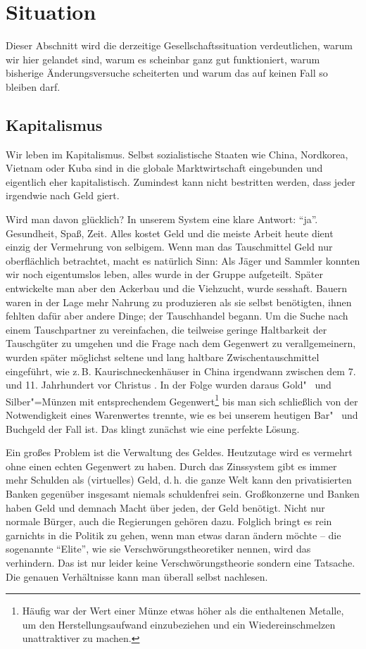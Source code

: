 \section{Situation}\label{sec:situation}

Dieser Abschnitt wird die derzeitige Gesellschaftssituation verdeutlichen, warum wir hier gelandet sind, warum es scheinbar ganz gut funktioniert, warum bisherige Änderungsversuche scheiterten und warum das auf keinen Fall so bleiben darf.

\subsection{Kapitalismus}\label{sec:situation/capitalism}

Wir leben im Kapitalismus. Selbst sozialistische Staaten wie China, Nordkorea, Vietnam oder Kuba sind in die globale Marktwirtschaft eingebunden und eigentlich eher kapitalistisch. Zumindest kann nicht bestritten werden, dass jeder irgendwie nach Geld giert.

Wird man davon glücklich? In unserem System eine klare Antwort: "`ja"'. Gesundheit, Spaß, Zeit. Alles kostet Geld und die meiste Arbeit heute dient einzig der Vermehrung von selbigem. Wenn man das Tauschmittel Geld nur oberflächlich betrachtet, macht es natürlich Sinn: Als Jäger und Sammler konnten wir noch eigentumslos leben, alles wurde in der Gruppe aufgeteilt. Später entwickelte man aber den Ackerbau und die Viehzucht, wurde sesshaft. Bauern waren in der Lage mehr Nahrung zu produzieren als sie selbst benötigten, ihnen fehlten dafür aber andere Dinge; der Tauschhandel begann. Um die Suche nach einem Tauschpartner zu vereinfachen, die teilweise geringe Haltbarkeit der Tauschgüter zu umgehen und die Frage nach dem Gegenwert zu verallgemeinern, wurden später möglichst seltene und lang haltbare Zwischentauschmittel eingeführt, wie z.\,B. Kaurischneckenhäuser in China irgendwann zwischen dem 7. und 11. Jahrhundert vor Christus \citep{yungti_2003}. In der Folge wurden daraus Gold"~ und Silber"=Münzen mit entsprechendem Gegenwert\footnote{Häufig war der Wert einer Münze etwas höher als die enthaltenen Metalle, um den Herstellungsaufwand einzubeziehen und ein Wiedereinschmelzen unattraktiver zu machen.} bis man sich schließlich von der Notwendigkeit eines Warenwertes trennte, wie es bei unserem heutigen Bar"~ und Buchgeld der Fall ist. Das klingt zunächst wie eine perfekte Lösung.

Ein großes Problem ist die Verwaltung des Geldes. Heutzutage wird es vermehrt ohne einen echten Gegenwert zu haben. Durch das Zinssystem gibt es immer mehr Schulden als (virtuelles) Geld, d.\,h. die ganze Welt kann den privatisierten Banken gegenüber insgesamt niemals schuldenfrei sein. Großkonzerne und Banken haben Geld und demnach Macht über jeden, der Geld benötigt. Nicht nur normale Bürger, auch die Regierungen gehören dazu. Folglich bringt es rein garnichts in die Politik zu gehen, wenn man etwas daran ändern möchte -- die sogenannte "`Elite"', wie sie Verschwörungstheoretiker nennen, wird das verhindern. Das ist nur leider keine Verschwörungstheorie sondern eine Tatsache. Die genauen Verhältnisse kann man überall selbst nachlesen.


